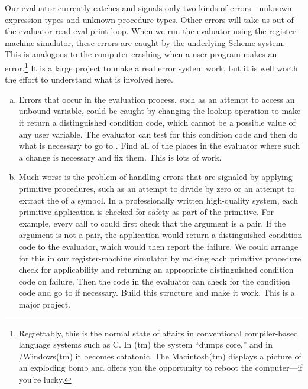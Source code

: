 \begin{exerciseGroup}
\begin{enumerate}[a.]
\end{enumerate}

\label{Exercise 5.30}
 Our evaluator currently catches
and signals only two kinds of errors---unknown expression types and unknown
procedure types.  Other errors will take us out of the evaluator
read-eval-print loop.  When we run the evaluator using the register-machine
simulator, these errors are caught by the underlying Scheme system.  This is
analogous to the computer crashing when a user program makes an
error.\footnote{Regrettably, this is the normal state of affairs in
conventional compiler-based language systems such as C.  In (tm)
the system ``dumps core,'' and in /Windows(tm) it becomes
catatonic.  The Macintosh(tm) displays a picture of an exploding bomb and
offers you the opportunity to reboot the computer---if you're lucky.}  It is a
large project to make a real error system work, but it is well worth the effort
to understand what is involved here.

\begin{enumerate}[a.]

\item
Errors that occur in the evaluation process, such as an attempt to access an
unbound variable, could be caught by changing the lookup operation to make it
return a distinguished condition code, which cannot be a possible value of any
user variable.  The evaluator can test for this condition code and then do what
is necessary to go to .  Find all of the places in the
evaluator where such a change is necessary and fix them.  This is lots of work.

\item
Much worse is the problem of handling errors that are signaled by applying
primitive procedures, such as an attempt to divide by zero or an attempt to
extract the  of a symbol.  In a professionally written high-quality
system, each primitive application is checked for safety as part of the
primitive.  For example, every call to  could first check that the
argument is a pair.  If the argument is not a pair, the application would
return a distinguished condition code to the evaluator, which would then report
the failure.  We could arrange for this in our register-machine simulator by
making each primitive procedure check for applicability and returning an
appropriate distinguished condition code on failure. Then the
 code in the evaluator can check for the condition code
and go to  if necessary.  Build this structure and make it
work.  This is a major project.

\end{enumerate}
\end{exerciseGroup}


